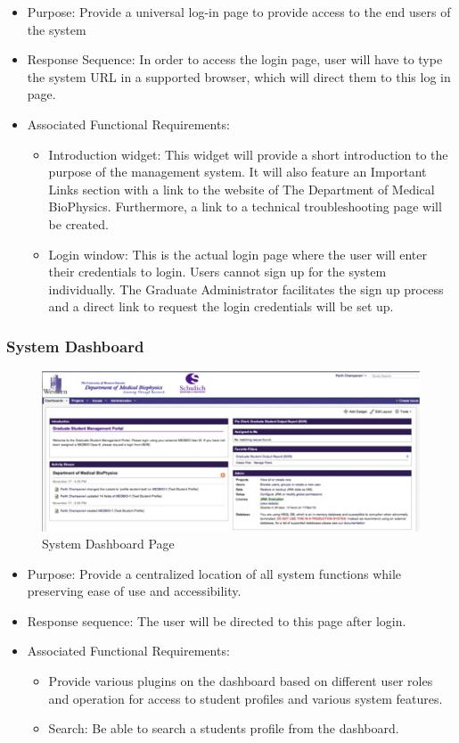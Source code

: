 \documentclass[11pt,a4paper]{report}
\begin{document}
\begin{itemize}
\item Purpose: Provide a universal log-in page to provide access to the end users of the system
\item Response Sequence: In order to access the login page, user will have to type the system URL in a supported browser, which will direct them to this log in page. 
\item Associated Functional Requirements: 
\begin {itemize} 
\item Introduction widget: This widget will provide a short introduction to the purpose of the management system. It will also feature an Important Links section with a link to the website of The Department of Medical BioPhysics. Furthermore, a link to a technical troubleshooting page will be created.
\item Login window: This is the actual login page where the user will enter their credentials to login. Users cannot sign up for the system individually. The Graduate Administrator facilitates the sign up process and a direct link to request the login credentials will be set up.
\end{itemize}
\end{itemize}


\subsubsection{System Dashboard}
\begin{figure}[htp]
\centering
\includegraphics[scale=1]{diagrams/HTMLTemplating/Figure2.jpg}
\caption{System Dashboard Page}
\label{fig:SystemDashBoard}
\end{figure}

\begin{itemize}
\item Purpose: Provide a centralized location of all system functions while preserving ease of use and accessibility.
\item Response sequence: The user will be directed to this page after login.
\item Associated Functional Requirements:
\begin{itemize}
\item Provide various plugins on the dashboard based on different user roles and operation for access to student profiles and various system features. 
\item Search: Be able to search a students profile from the dashboard.
\end{itemize}
\end{itemize}
\end{document}
